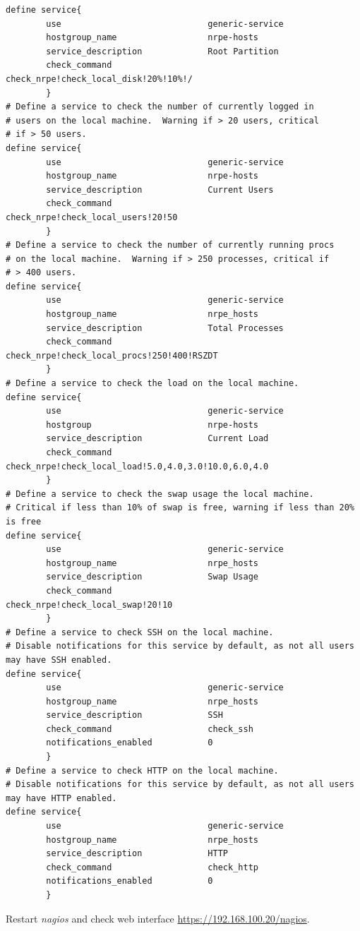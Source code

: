 \documentclass[10pt,a4paper,final]{report}
\begin{document}
\begin{lstlisting}
define service{
        use                             generic-service
        hostgroup_name                  nrpe-hosts
        service_description             Root Partition
	    check_command                   check_nrpe!check_local_disk!20%!10%!/
        }
# Define a service to check the number of currently logged in
# users on the local machine.  Warning if > 20 users, critical
# if > 50 users.
define service{
        use                             generic-service
        hostgroup_name                  nrpe-hosts
        service_description             Current Users
	    check_command                   check_nrpe!check_local_users!20!50
        }
# Define a service to check the number of currently running procs
# on the local machine.  Warning if > 250 processes, critical if
# > 400 users.
define service{
        use                             generic-service
        hostgroup_name                  nrpe_hosts
        service_description             Total Processes
	    check_command                   check_nrpe!check_local_procs!250!400!RSZDT
        }
# Define a service to check the load on the local machine. 
define service{
        use                             generic-service
        hostgroup                       nrpe-hosts
        service_description             Current Load
	    check_command			        check_nrpe!check_local_load!5.0,4.0,3.0!10.0,6.0,4.0
        }
# Define a service to check the swap usage the local machine. 
# Critical if less than 10% of swap is free, warning if less than 20% is free
define service{
        use                             generic-service
        hostgroup_name                  nrpe_hosts
        service_description             Swap Usage
	    check_command			        check_nrpe!check_local_swap!20!10
        }
# Define a service to check SSH on the local machine.
# Disable notifications for this service by default, as not all users may have SSH enabled.
define service{
        use                             generic-service
        hostgroup_name                  nrpe_hosts
        service_description             SSH
	    check_command			        check_ssh
	    notifications_enabled		    0
        }
# Define a service to check HTTP on the local machine.
# Disable notifications for this service by default, as not all users may have HTTP enabled.
define service{
        use                             generic-service
        hostgroup_name                  nrpe_hosts
        service_description             HTTP
	    check_command			        check_http
	    notifications_enabled		    0
        }
\end{lstlisting}
Restart \emph{nagios} and check web interface \url{https://192.168.100.20/nagios}.
\end{document}
